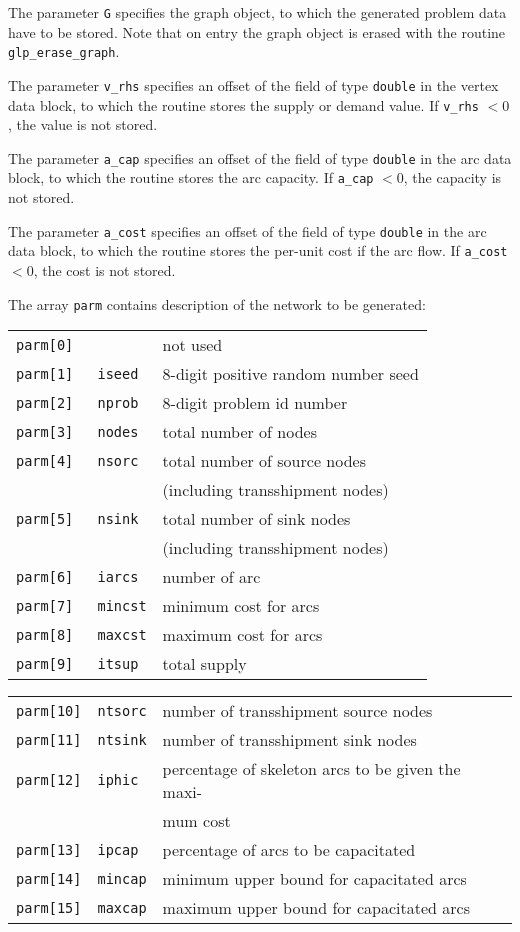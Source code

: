 \documentclass[dvipdfm,11pt]{report}
\begin{document}
The parameter \verb|G| specifies the graph object, to which the
generated  problem data have to be stored. Note that on entry the graph
object  is erased with the routine \verb|glp_erase_graph|.

The parameter \verb|v_rhs| specifies an offset of the field of type
\verb|double| in the vertex data block, to which the routine stores the
supply or  demand value. If \verb|v_rhs| $<0$, the value is not stored.

The parameter \verb|a_cap| specifies an offset of the field of type
\verb|double| in the arc data block, to which the routine stores the
arc capacity. If \verb|a_cap| $<0$, the capacity is not stored.

The parameter \verb|a_cost| specifies an offset of the field of type
\verb|double| in the arc data block, to which the routine stores the
per-unit cost if the arc flow. If \verb|a_cost| $<0$, the cost is not
stored.

The array \verb|parm| contains description of the network to be
generated:

\begin{tabular}{@{}lll@{}}
\verb|parm[0] |&             &not used\\
\verb|parm[1] |&\verb|iseed |&8-digit positive random number seed\\
\verb|parm[2] |&\verb|nprob |&8-digit problem id number\\
\verb|parm[3] |&\verb|nodes |&total number of nodes\\
\verb|parm[4] |&\verb|nsorc |&total number of source nodes\\
&&(including transshipment nodes)\\
\verb|parm[5] |&\verb|nsink |&total number of sink nodes\\
&&(including transshipment nodes)\\
\verb|parm[6] |&\verb|iarcs |&number of arc\\
\verb|parm[7] |&\verb|mincst|&minimum cost for arcs\\
\verb|parm[8] |&\verb|maxcst|&maximum cost for arcs\\
\verb|parm[9] |&\verb|itsup |&total supply\\
\end{tabular}

\begin{tabular}{@{}lll@{}}
\verb|parm[10]|&\verb|ntsorc|&number of transshipment source nodes\\
\verb|parm[11]|&\verb|ntsink|&number of transshipment sink nodes\\
\verb|parm[12]|&\verb|iphic |&percentage of skeleton arcs to be given
the maxi-\\&&mum cost\\
\verb|parm[13]|&\verb|ipcap |&percentage of arcs to be capacitated\\
\verb|parm[14]|&\verb|mincap|&minimum upper bound for capacitated arcs\\
\verb|parm[15]|&\verb|maxcap|&maximum upper bound for capacitated arcs\\
\end{tabular}
\end{document}
